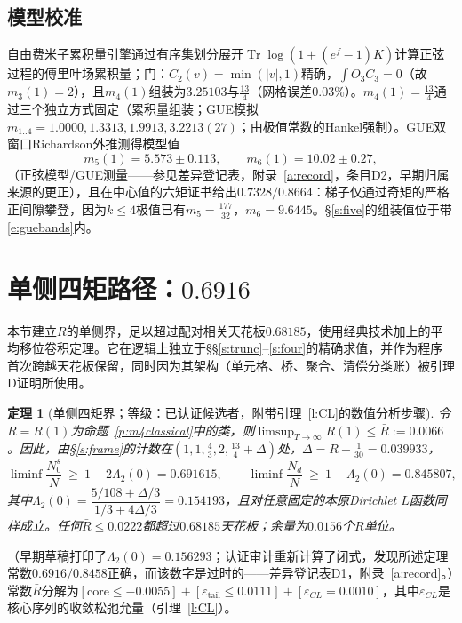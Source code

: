 \documentclass[11pt]{article}
\numberwithin{equation}{section}
\newtheorem{theorem}{定理}[section]
\theoremstyle{definition}
\theoremstyle{remark}
\begin{document}
\subsection{模型校准}\label{s:cert:model}

自由费米子累积量引擎通过有序集划分展开$\operatorname{Tr}\log(1+(e^f-1)K)$计算正弦过程的傅里叶场累积量；门：$C_2(v)=\min(|v|,1)$精确，$\int O_3C_3=0$（故$m_3(1)=2$），且$m_4(1)$组装为$3.25103$与$\tfrac{13}4$（网格误差$0.03\%$）。$m_4(1)=\tfrac{13}4$通过三个独立方式固定（累积量组装；GUE模拟$m_{1..4}=1.0000,1.3313,1.9913,3.2213(27)$；由极值常数的Hankel强制）。GUE双窗口Richardson外推测得模型值
\begin{equation}\label{e:guebands}
m_5(1)=5.573\pm0.113,\qquad m_6(1)=10.02\pm0.27,
\end{equation}
（正弦模型/GUE测量——参见差异登记表，附录~\ref{a:record}，条目D2，早期归属来源的更正），且在中心值的六矩证书给出$0.7328/0.8664$：梯子仅通过奇矩的严格正间隙攀登，因为$k\le4$极值已有$m_5=\tfrac{177}{32}$，$m_6=9.6445$。\S\ref{s:five}的组装值位于带\eqref{e:guebands}内。

\section{单侧四矩路径：$0.6916$}\label{s:fm}

本节建立$R$的单侧界，足以超过配对相关天花板$0.68185$，使用经典技术加上\cite{MRT}的平均移位卷积定理。它在逻辑上独立于\S\S\ref{s:trunc}--\ref{s:four}的精确求值，并作为程序首次跨越天花板保留，同时因为其架构（单元格、桥、聚合、清偿分类账）被引理D证明所使用。

\begin{theorem}[单侧四矩界；等级：已认证候选者，附带引理~\ref{l:CL}的数值分析步骤]\label{t:fm}
令$R=R(1)$为命题~\ref{p:m4classical}中的类，则$\limsup_{T\to\infty}R(1)\le\bar R:=0.0066$。因此，由\S\ref{s:frame}的计数在$(1,1,\tfrac43,2,\tfrac{13}4+\Delta)$处，$\Delta=\bar R+\tfrac1{30}=0.039933$，
\[
\liminf\frac{N_0^{s}}{N}\ \ge\ 1-2\Lambda_2(0)=0.691615,
\qquad
\liminf\frac{N_d}{N}\ \ge\ 1-\Lambda_2(0)=0.845807,
\]
其中$\Lambda_2(0)=\dfrac{5/108+\Delta/3}{1/3+4\Delta/3}=0.154193$，且对任意固定的本原Dirichlet $L$函数同样成立。任何$\bar R\le0.0222$都超过$0.68185$天花板；余量为$0.0156$个$R$单位。
\end{theorem}

\noindent（早期草稿打印了$\Lambda_2(0)=0.156293$；认证审计重新计算了闭式，发现所述定理常数$0.6916/0.8458$正确，而该数字是过时的——差异登记表D1，附录~\ref{a:record}。）常数$\bar R$分解为$[\mathrm{core}\le-0.0055]+[\varepsilon_{\mathrm{tail}}\le0.0111]+[\varepsilon_{CL}=0.0010]$，其中$\varepsilon_{CL}$是核心序列的收敛松弛允量（引理~\ref{l:CL}）。
\end{document}
